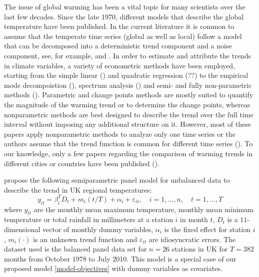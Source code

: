 \documentclass[a4paper,12pt]{article}
\begin{document}
\begin{example}
The issue of global warming has been a vital topic for many scientists over the last few decades. Since the late 1970, different models that describe the global temperature have been published. In the current literature it is common to assume that the temperate time series (global as well as local) follow a model that can be decomposed into a deterministic trend component and a noise component, see, for example, \cite{Ghil1991} and \cite{Mudelsee2018}. In order to estimate and attribute the trends in climate variables, a variety of econometric methods have been employed, starting from the simple linear (\cite{Yue2013}) and quadratic regression (??) to the empirical mode decompoistion (\cite{Wu2011}), spectrum analysis (\cite{Ghil1991}) and semi- and fully non-parametric methods (\cite{Gao2006}). Parametric and change points methods are mostly suited to quantify the magnitude of the warming trend or to determine the change points, whereas nonparametric methods are best designed to describe the trend over the full time interval without imposing any additional structure on it. However, most of these papers apply nonparametric methods to analyze only one time series or the authors assume that the trend function is common for different time series (\cite{Atak2011}). To our knowledge, only a few papers regarding the comparison of warming trends in different cities or countries have been published (\cite{Zhang2012}). 


\cite{Zhang2012} propose the following semiparametric panel model for unbalanced data to describe the trend in UK regional temperatures:
\begin{equation}\label{model-atak}
y_{it} =\beta_i^{T}D_t + m_i(t/T) + \alpha_i + \varepsilon_{it},\quad i =1, \ldots, n, \quad t=1, \ldots, T
\end{equation}
where $y_{it}$ are the monthly mean maximum temperature, monthly mean minimum temperature or total rainfall in millimeters at a station $i$ in month $t$, $D_t$ is a $11$-dimensional vector of monthly dummy variables, $\alpha_i$ is the fixed effect for station $i$, $m_i(\cdot)$ is an unknown trend function and $\varepsilon_{it}$ are idiosyncratic errors. The dataset used is the balanced panel data set for $n=26$ stations in UK for $T=382$ months from October 1978 to July 2010. This model is a special case of our proposed model \eqref{model-objectives} with dummy variables as covariates.


\end{example}
\end{document}
